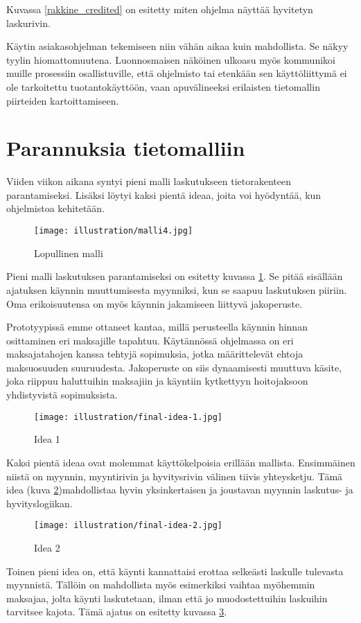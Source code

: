 Kuvassa \ref{rakkine_credited} on esitetty miten ohjelma näyttää
hyvitetyn laskurivin.

Käytin asiakasohjelman tekemiseen niin vähän aikaa kuin mahdollista. Se
näkyy tyylin hiomattomuutena. Luonnosmaisen näköinen ulkoasu myös
kommunikoi muille prosessiin osallistuville, että ohjelmisto tai
etenkään sen käyttöliittymä ei ole tarkoitettu tuotantokäyttöön, vaan
apuvälineeksi erilaisten tietomallin piirteiden kartoittamiseen.

\hypertarget{parannuksia-tietomalliin}{%
\section{Parannuksia tietomalliin}\label{parannuksia-tietomalliin}}

Viiden viikon aikana syntyi pieni malli laskutukseen tietorakenteen
parantamiseksi. Lisäksi löytyi kaksi pientä ideaa, joita voi hyödyntää,
kun ohjelmistoa kehitetään.

\begin{figure}
\centering
\texttt{[image: illustration/malli4.jpg]}
\caption{\label{finalmodel1-again}Lopullinen malli}
\end{figure}

Pieni malli laskutuksen parantamiseksi on esitetty kuvassa
\ref{finalmodel1-again}. Se pitää sisällään ajatuksen käynnin
muuttumisesta myynniksi, kun se saapuu laskutuksen piiriin. Oma
erikoisuutensa on myös käynnin jakamiseen liittyvä jakoperuste.

Prototyypissä emme ottaneet kantaa, millä perusteella käynnin hinnan
osittaminen eri maksajille tapahtuu. Käytännössä ohjelmassa on eri
maksajatahojen kanssa tehtyjä sopimuksia, jotka määrittelevät ehtoja
maksuosuuden suuruudesta. Jakoperuste on siis dynaamisesti muuttuva
käsite, joka riippuu haluttuihin maksajiin ja käyntiin kytkettyyn
hoitojaksoon yhdistyvistä sopimuksista.

\begin{figure}
\centering
\texttt{[image: illustration/final-idea-1.jpg]}
\caption{\label{finalidea1}Idea 1}
\end{figure}

Kaksi pientä ideaa ovat molemmat käyttökelpoisia erillään mallista.
Ensimmäinen niistä on myynnin, myyntirivin ja hyvitysrivin välinen
tiivis yhteysketju. Tämä idea (kuva \ref{finalidea1})mahdollistaa hyvin
yksinkertaisen ja joustavan myynnin laskutus- ja hyvityslogiikan.

\begin{figure}
\centering
\texttt{[image: illustration/final-idea-2.jpg]}
\caption{\label{finalidea2}Idea 2}
\end{figure}

Toinen pieni idea on, että käynti kannattaisi erottaa selkeästi laskulle
tulevasta myynnistä. Tällöin on mahdollista myös esimerkiksi vaihtaa
myöhemmin maksajaa, jolta käynti laskutetaan, ilman että jo
muodostettuihin laskuihin tarvitsee kajota. Tämä ajatus on esitetty
kuvassa \ref{finalidea2}.
